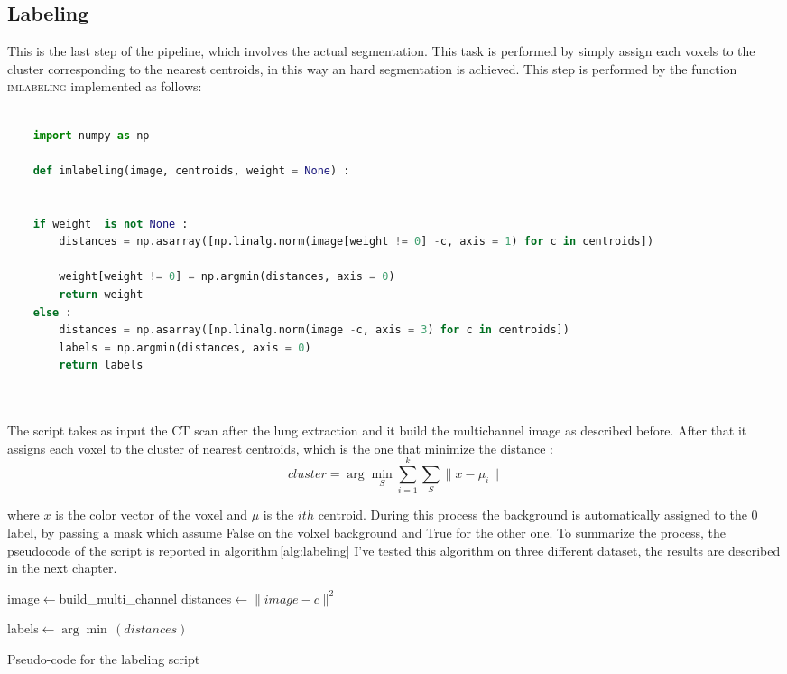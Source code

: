 
	
	\subsection{Labeling}
	
	This is the last step of the pipeline, which involves the actual segmentation. This task is performed by simply assign each voxels to the cluster corresponding to the nearest centroids, in this way an hard segmentation is achieved.
	This step is performed by the function \textsc{imlabeling} implemented as follows: 
		
	\lstset{style=python}
	\begin{lstlisting}[language=python, caption=kmenas\_on\_subsamples, label=code:kmeans]
		
	import numpy as np
	
	def imlabeling(image, centroids, weight = None) :


	if weight  is not None :
		distances = np.asarray([np.linalg.norm(image[weight != 0] -c, axis = 1) for c in centroids])
		
		weight[weight != 0] = np.argmin(distances, axis = 0)
		return weight
	else :
		distances = np.asarray([np.linalg.norm(image -c, axis = 3) for c in centroids])
		labels = np.argmin(distances, axis = 0)
		return labels
	
	
	\end{lstlisting}
	
	The script takes as input the CT scan after the lung extraction and it build the multichannel image as described before. After that it assigns each voxel to the cluster of nearest centroids, which is the one that minimize the distance : 
	\begin{equation}
		cluster = \arg\min_{S}  \sum_{i=1}^k \sum_{S} \| x - \mu_i\|
	\end{equation}

	where $x$ is the color vector of the voxel and $\mu$ is the $ith$ centroid. During this process the background is automatically assigned to the 0 label, by passing a mask which assume False on the volxel background and True for the other one.
	To summarize the process, the pseudocode of the script is reported in algorithm\,\ref{alg:labeling}
	 I've tested this algorithm on three different dataset, the results are described in the next chapter.
	 
	 	\begin{algorithm}
	 	
	 	\SetAlgoLined
	 	\DontPrintSemicolon
	 	
	
 		
 		image$\leftarrow$build\_multi\_channel\;
 		{
 			distances$\leftarrow\| image - c\|^2$\;
 		}
 		
 		labels$\leftarrow\arg\min\,(distances)$\;
	 
	 	\caption{Pseudo-code for the labeling script}\label{alg:labeling}
	 
	 \end{algorithm}
	 
	
	
